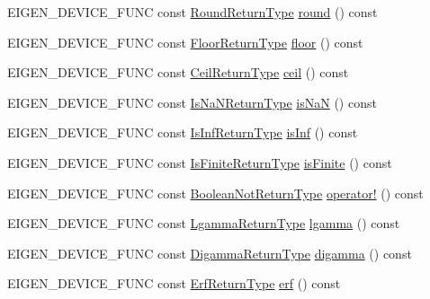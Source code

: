 \begin{DoxyCompactItemize}
\item 
E\+I\+G\+E\+N\+\_\+\+D\+E\+V\+I\+C\+E\+\_\+\+F\+U\+NC const \mbox{\hyperlink{class_eigen_1_1_cwise_unary_op}{Round\+Return\+Type}} \mbox{\hyperlink{class_eigen_1_1_array_base_a354b5032ab3852a015a55b4dbf257d3d}{round}} () const
\item 
E\+I\+G\+E\+N\+\_\+\+D\+E\+V\+I\+C\+E\+\_\+\+F\+U\+NC const \mbox{\hyperlink{class_eigen_1_1_cwise_unary_op}{Floor\+Return\+Type}} \mbox{\hyperlink{class_eigen_1_1_array_base_a1dbd24e0b04ddd157436086266f917fd}{floor}} () const
\item 
E\+I\+G\+E\+N\+\_\+\+D\+E\+V\+I\+C\+E\+\_\+\+F\+U\+NC const \mbox{\hyperlink{class_eigen_1_1_cwise_unary_op}{Ceil\+Return\+Type}} \mbox{\hyperlink{class_eigen_1_1_array_base_a644fa9e672def0cd2bdab1f4efe6400e}{ceil}} () const
\item 
E\+I\+G\+E\+N\+\_\+\+D\+E\+V\+I\+C\+E\+\_\+\+F\+U\+NC const \mbox{\hyperlink{class_eigen_1_1_cwise_unary_op}{Is\+Na\+N\+Return\+Type}} \mbox{\hyperlink{class_eigen_1_1_array_base_a683843fca0a48ae0d39374ec8890aac9}{is\+NaN}} () const
\item 
E\+I\+G\+E\+N\+\_\+\+D\+E\+V\+I\+C\+E\+\_\+\+F\+U\+NC const \mbox{\hyperlink{class_eigen_1_1_cwise_unary_op}{Is\+Inf\+Return\+Type}} \mbox{\hyperlink{class_eigen_1_1_array_base_ac35a8119b6fa65e1780e0845a8c4c141}{is\+Inf}} () const
\item 
E\+I\+G\+E\+N\+\_\+\+D\+E\+V\+I\+C\+E\+\_\+\+F\+U\+NC const \mbox{\hyperlink{class_eigen_1_1_cwise_unary_op}{Is\+Finite\+Return\+Type}} \mbox{\hyperlink{class_eigen_1_1_array_base_a4e06a44043a006a487c57acf068305a2}{is\+Finite}} () const
\item 
E\+I\+G\+E\+N\+\_\+\+D\+E\+V\+I\+C\+E\+\_\+\+F\+U\+NC const \mbox{\hyperlink{class_eigen_1_1_cwise_unary_op}{Boolean\+Not\+Return\+Type}} \mbox{\hyperlink{class_eigen_1_1_array_base_a43cb8d15f6ad4ee1f0a03bf6a4dc673a}{operator!}} () const
\item 
E\+I\+G\+E\+N\+\_\+\+D\+E\+V\+I\+C\+E\+\_\+\+F\+U\+NC const \mbox{\hyperlink{class_eigen_1_1_cwise_unary_op}{Lgamma\+Return\+Type}} \mbox{\hyperlink{class_eigen_1_1_array_base_aaacc294090a265da0dc695737750dd28}{lgamma}} () const
\item 
E\+I\+G\+E\+N\+\_\+\+D\+E\+V\+I\+C\+E\+\_\+\+F\+U\+NC const \mbox{\hyperlink{class_eigen_1_1_cwise_unary_op}{Digamma\+Return\+Type}} \mbox{\hyperlink{class_eigen_1_1_array_base_a8fe3f90b672d2c4e80bf1c74b6b088e5}{digamma}} () const
\item 
E\+I\+G\+E\+N\+\_\+\+D\+E\+V\+I\+C\+E\+\_\+\+F\+U\+NC const \mbox{\hyperlink{class_eigen_1_1_cwise_unary_op}{Erf\+Return\+Type}} \mbox{\hyperlink{class_eigen_1_1_array_base_aa63d066102c083a96f0abec99a330f60}{erf}} () const

\end{DoxyCompactItemize}
